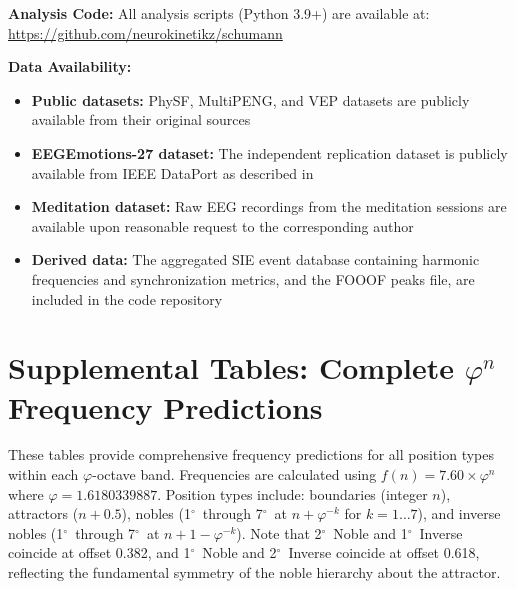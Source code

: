\documentclass[11pt,a4paper]{article}
\newcommand{\degree}{$^\circ$}  %
\newcommand{\phisym}{\varphi}
\begin{document}
\textbf{Analysis Code:} All analysis scripts (Python 3.9+) are available at: \url{https://github.com/neurokinetikz/schumann}

\textbf{Data Availability:}
\begin{itemize}
    \item \textbf{Public datasets:} PhySF, MultiPENG, and VEP datasets are publicly available from their original sources \parencite{albuquerque2024physf, albuquerque2023multimodal, faisal2023eeg}
    \item \textbf{EEGEmotions-27 dataset:} The independent replication dataset is publicly available from IEEE DataPort as described in \textcite{huy2025eeg}
    \item \textbf{Meditation dataset:} Raw EEG recordings from the meditation sessions are available upon reasonable request to the corresponding author
    \item \textbf{Derived data:} The aggregated SIE event database containing harmonic frequencies and synchronization metrics, and the FOOOF peaks file, are included in the code repository
\end{itemize}

\printbibliography

\newpage
\section*{Supplemental Tables: Complete $\phisym^n$ Frequency Predictions}

These tables provide comprehensive frequency predictions for all position types within each $\phisym$-octave band. Frequencies are calculated using $f(n) = 7.60 \times \phisym^n$ where $\phisym = 1.6180339887$. Position types include: boundaries (integer $n$), attractors ($n + 0.5$), nobles (1\degree\ through 7\degree\ at $n + \phisym^{-k}$ for $k = 1 \ldots 7$), and inverse nobles (1\degree\ through 7\degree\ at $n + 1 - \phisym^{-k}$). Note that 2\degree\ Noble and 1\degree\ Inverse coincide at offset 0.382, and 1\degree\ Noble and 2\degree\ Inverse coincide at offset 0.618, reflecting the fundamental symmetry of the noble hierarchy about the attractor.
\end{document}
